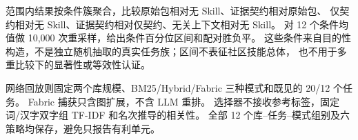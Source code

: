 范围内结果按条件簇聚合，比较原始包相对无 Skill、证据契约相对原始包、
仅契约相对无 Skill、证据契约相对仅契约、无关上下文相对无 Skill。
对 12 个条件均值做 10,000 次重采样，给出条件百分位区间和配对胜负平。
这些条件来自目的性构造，不是独立随机抽取的真实任务族；区间不表征社区技能总体，
也不用于多重比较下的显著性或等效性认证。

网络回放则固定两个库规模、BM25/Hybrid/Fabric 三种模式和既见的 20/12 个任务。
Fabric 捕获只含图扩展，不含 LLM 重排。
选择器不接收参考标签，固定词/汉字双字组 TF-IDF 和名次推导的相关性。
全部 12 个库--任务--模式组别及六策略均保存，避免只报告有利单元。
